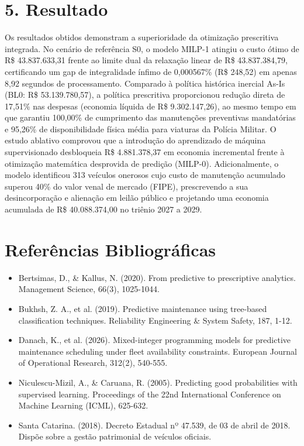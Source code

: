 \documentclass[10pt,a4paper,journal]{article}
\begin{document}
\section{5. Resultado}
Os resultados obtidos demonstram a superioridade da otimização prescritiva integrada. No cenário de referência S0, o modelo MILP-1 atingiu o custo ótimo de R\$ 43.837.633,31 frente ao limite dual da relaxação linear de R\$ 43.837.384,79, certificando um gap de integralidade ínfimo de 0,000567\% (R\$ 248,52) em apenas 8,92 segundos de processamento. Comparado à política histórica inercial As-Is (BL0: R\$ 53.139.780,57), a política prescritiva proporcionou redução direta de 17,51\% nas despesas (economia líquida de R\$ 9.302.147,26), ao mesmo tempo em que garantiu 100,00\% de cumprimento das manutenções preventivas mandatórias e 95,26\% de disponibilidade física média para viaturas da Polícia Militar. O estudo ablativo comprovou que a introdução do aprendizado de máquina supervisionado desbloqueia R\$ 4.881.378,37 em economia incremental frente à otimização matemática desprovida de predição (MILP-0). Adicionalmente, o modelo identificou 313 veículos onerosos cujo custo de manutenção acumulado superou 40\% do valor venal de mercado (FIPE), prescrevendo a sua desincorporação e alienação em leilão público e projetando uma economia acumulada de R\$ 40.088.374,00 no triênio 2027 a 2029.

\section{Referências Bibliográficas}
\begin{itemize}
\item Bertsimas, D., \& Kallus, N. (2020). From predictive to prescriptive analytics. Management Science, 66(3), 1025-1044.
\end{itemize}
\begin{itemize}
\item Bukhsh, Z. A., et al. (2019). Predictive maintenance using tree-based classification techniques. Reliability Engineering \& System Safety, 187, 1-12.
\end{itemize}
\begin{itemize}
\item Danach, K., et al. (2026). Mixed-integer programming models for predictive maintenance scheduling under fleet availability constraints. European Journal of Operational Research, 312(2), 540-555.
\end{itemize}
\begin{itemize}
\item Niculescu-Mizil, A., \& Caruana, R. (2005). Predicting good probabilities with supervised learning. Proceedings of the 22nd International Conference on Machine Learning (ICML), 625-632.
\end{itemize}
\begin{itemize}
\item Santa Catarina. (2018). Decreto Estadual nº 47.539, de 03 de abril de 2018. Dispõe sobre a gestão patrimonial de veículos oficiais.
\end{itemize}
\end{document}
